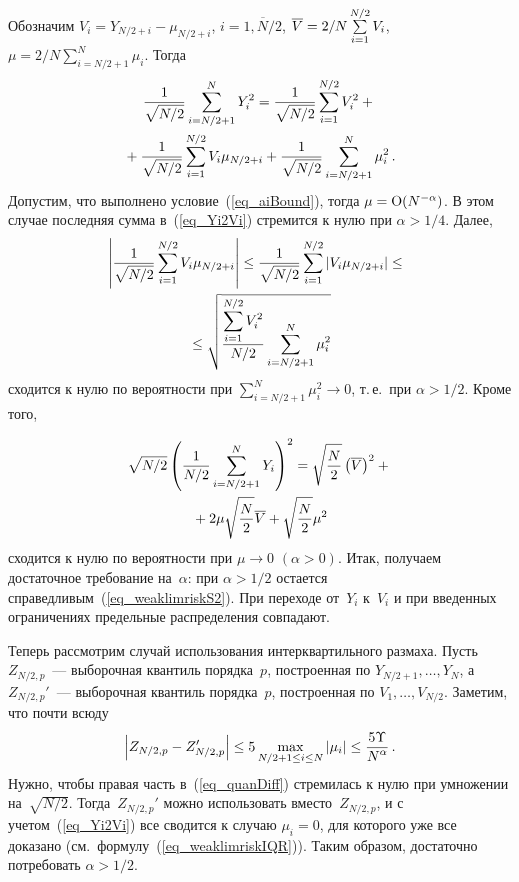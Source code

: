 \begin{multicols}{2}
Обозначим $V_i=Y_{N/2+i}-\mu_{N/2+i}$, $i=\overline{1,N/2}$, 
$\overline{V}=2/N\sum\limits_{i=1}^{N/2}V_i$, $\mu=2/N\sum\limits_{i=N/2+1}^{N}\mu_i$. Тогда
\begin{multline}
\label{eq_Yi2Vi}
\displaystyle\frac{\displaystyle 1\mathstrut}{\displaystyle \sqrt{N/2}\mathstrut}\sum\limits_{i=N/2+1}^N Y_i^2 = 
\displaystyle\frac{\displaystyle 1\mathstrut}{\displaystyle \sqrt{N/2}\mathstrut}\sum\limits_{i=1}^{N/2}V_i^2 + {}\\
{}+
\displaystyle\frac{\displaystyle 1\mathstrut}{\displaystyle \sqrt{N/2}\mathstrut}\sum\limits_{i=1}^{N/2}V_i\mu_{N/2+i} +
\displaystyle\frac{\displaystyle 1\mathstrut}{\displaystyle \sqrt{N/2}\mathstrut}\sum\limits_{i=N/2+1}^N \mu_i^2\,.
\end{multline}
Допустим, что выполнено условие~(\ref{eq_aiBound}), тогда $\mu=\textrm{O}(N^{-\alpha})$. 
В этом случае последняя сумма в~(\ref{eq_Yi2Vi}) стремится к нулю при $\alpha>1/4$. Далее,
\begin{multline*}
\!\!\left|\displaystyle\frac{\displaystyle 1\mathstrut}{\displaystyle \sqrt{N/2}\mathstrut}\sum\limits_{i=1}^{N/2}V_i\mu_{N/2+i}\right| \leq 
\displaystyle\frac{\displaystyle 1\mathstrut}{\displaystyle \sqrt{N/2}\mathstrut}\sum\limits_{i=1}^{N/2}|V_i\mu_{N/2+i}| \leq {}\\
{}\leq
\sqrt{\displaystyle\frac{\displaystyle \sum\limits_{i=1}^{N/2}V_i^2\mathstrut}{\displaystyle N/2\mathstrut}\sum\limits_{i=N/2+1}^N\mu_i^2}
\end{multline*}
сходится к нулю по вероятности при $\sum\limits_{i=N/2+1}^N\mu_i^2\rightarrow 0$, т.\,е.\ 
при $\alpha>1/2$. Кроме того,

\noindent
\begin{multline*}
\sqrt{N/2}\left(
\displaystyle\frac{\displaystyle 1\mathstrut}{\displaystyle N/2\mathstrut}\sum\limits_{i=N/2+1}^N Y_i\right)^2 = \sqrt{\displaystyle\frac{\displaystyle N\mathstrut}{\displaystyle 2\mathstrut}}\left(\overline{V}\right)^2 +{}\\
{}+ 2\mu\sqrt{\displaystyle\frac{\displaystyle N\mathstrut}{\displaystyle 2\mathstrut}}\overline{V} + \sqrt{\displaystyle\frac{\displaystyle N\mathstrut}{\displaystyle 2\mathstrut}}\mu^2
\end{multline*}
сходится к нулю по вероятности при $\mu\rightarrow 0$ $\left(\alpha>0\right)$. 
Итак, получаем достаточное требование на~$\alpha$: при $\alpha>1/2$ остается справедливым~(\ref{eq_weaklimriskS2}). 
При переходе от~$Y_i$ к~$V_i$ и при введенных ограничениях предельные распределения совпадают.

Теперь рассмотрим случай использования интерквартильного размаха. 
Пусть $Z_{N/2,p}$~--- выборочная квантиль порядка~$p$, построенная по $Y_{N/2+1},\ldots,Y_N$, 
а $Z_{N/2,p}'$~--- выборочная квантиль порядка~$p$, построенная по $V_1,\ldots,V_{N/2}$. Заметим, что почти всюду
\begin{equation}
\label{eq_quanDiff}
\left| Z_{N/2,p} - Z_{N/2,p}' \right| \leq 5 \max_{N/2+1\leq i\leq N} |\mu_i| \leq \displaystyle\frac{\displaystyle 5\Upsilon\mathstrut}{\displaystyle N^{\alpha}\mathstrut}\,.
\end{equation}
Нужно, чтобы правая часть в~(\ref{eq_quanDiff}) стремилась к нулю при умножении на~$\sqrt{N/2}$. 
Тогда~$Z_{N/2,p}'$ можно использовать вместо~$Z_{N/2,p}$, и с учетом~(\ref{eq_Yi2Vi}) все сводится к 
случаю $\mu_i=0$, для которого уже все доказано (см.\ формулу~(\ref{eq_weaklimriskIQR})). 
Таким образом, достаточно потребовать $\alpha>1/2$.


\end{multicols}
